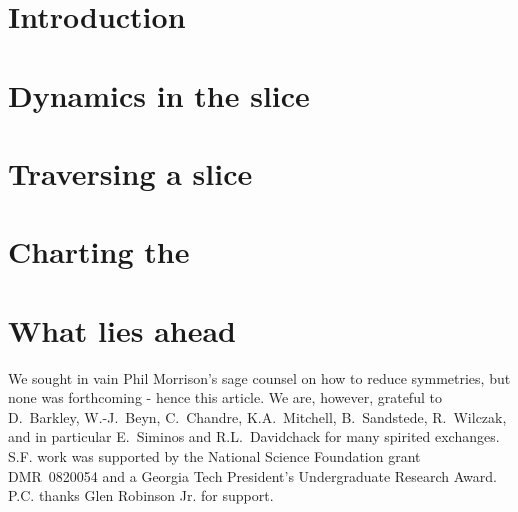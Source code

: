 \documentclass[%
 reprint,%
 amssymb, amsmath,%
 aip,cha,%
 graphicx
]{revtex4-1}
\begin{document}
\section{Introduction}
    \label{sec:intro}
    

\section{\Mframes}
    \label{sec:frame}
    

\section{Dynamics in the slice}
    \label{sec:mslices}
    

\section{Traversing a slice {\sset}}
	\label{sect:singul}
    

\section{Charting the \reducedsp}
	\label{sec:chart}
    

\section{What lies ahead} %
    \label{sec:concl}
    

\begin{acknowledgments}
We sought in vain Phil Morrison's sage counsel on how
to reduce symmetries, but none was forthcoming - hence this article.
We are, however, grateful to
D.~Barkley,
W.-J.~Beyn,
C.~Chandre,
K.A.~Mitchell,
B.~Sandstede,
R.~Wilczak,
and in particular E.~Siminos and R.L.~Davidchack
for many spirited exchanges.
S.F. work was supported by the National Science Foundation
grant DMR~0820054 and a Georgia Tech President's Undergraduate
Research Award.
P.C. thanks Glen Robinson Jr. for support. 	
\end{acknowledgments}



\PublicPrivate{}{
\newpage

	} %
\end{document}
